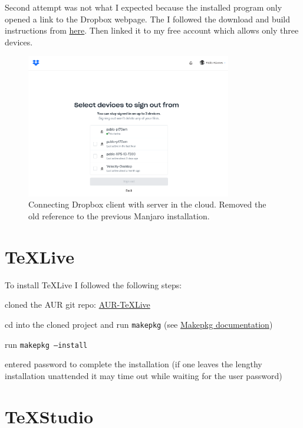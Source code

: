 \documentclass[]{scrartcl}
\begin{document}
Second attempt was not what I expected because the installed program only opened a link to the Dropbox webpage.
The I followed the download and build instructions from \href{https://help.dropbox.com/installs-integrations/desktop/linux-commands}{here}. 
Then linked it to my free account which allows only three devices.

\begin{figure}[!htb]
	\centering
	\caption{Connecting Dropbox client with server in the cloud. Removed the old reference to the previous Manjaro installation.}
	\includegraphics[width=0.8\textwidth]{Images/DropBoxSetUp.png}
\end{figure}

\section{\TeX{}Live}

 To install \TeX{}Live I followed the following steps:
 
\begin{compactenum}
	\item cloned the AUR git repo: \href{https://aur.archlinux.org/packages/texlive-full}{AUR-TeXLive}
	\item cd into the cloned project and run \texttt{makepkg} (see \href{https://wiki.archlinux.org/title/Makepkg}{Makepkg documentation})
	\item run \texttt{makepkg --install}
	\item entered password to complete the installation (if one leaves the lengthy installation unattended it may time out while waiting for the user password)
\end{compactenum}


\section{\TeX{}Studio}
\end{document}
